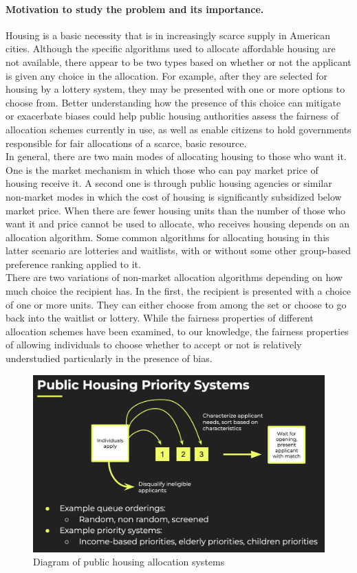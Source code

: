 \documentclass[11pt]{article}
\begin{document}
\paragraph{Motivation to study the problem and its importance.}
Housing is a basic necessity that is in increasingly scarce supply in American cities. Although the specific algorithms used to allocate affordable housing are not available, there appear to be two types based on whether or not the applicant is given any choice in the allocation. For example, after they are selected for housing by a lottery system, they may be presented with one or more options to choose from. 
Better understanding how the presence of this choice can mitigate or exacerbate biases could help public housing authorities assess the fairness of allocation schemes currently in use, as well as enable citizens to hold governments responsible for fair allocations of a scarce, basic resource.  \\
\newline
In general, there are two main modes of allocating housing to those who want it. One is the market mechanism in which those who can pay market price of housing receive it. A second one is through public housing agencies or similar non-market modes in which the cost of housing is significantly subsidized below market price. When there are fewer housing units than the number of those who want it and price cannot be used to allocate, who receives housing depends on an allocation algorithm. Some common algorithms for allocating housing in this latter scenario are lotteries and waitlists, with or without some other group-based preference ranking applied to it.   \\
\newline
There are two variations of non-market allocation algorithms depending on how much choice the recipient has. In the first, the recipient is presented with a choice of one or more units. They can either choose from among the set or choose to go back into the waitlist or lottery. While the fairness properties of different allocation schemes have been examined, to our knowledge, the fairness properties of allowing individuals to choose whether to accept or not is relatively understudied particularly in the presence of bias. 

\begin{figure}
    \centering
    \includegraphics[width=0.75\linewidth]{schematic_priority _systems.png}
    \caption{Diagram of public housing allocation systems}
    \label{fig:schematic}
\end{figure}
\end{document}
